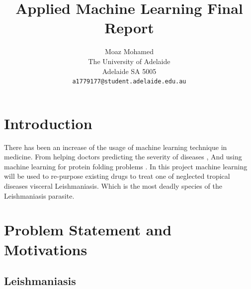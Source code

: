 \documentclass[10pt,twocolumn,letterpaper]{article}
\begin{document}
\title{Applied Machine Learning Final Report}

\author{Moaz Mohamed\\
The University of Adelaide\\
Adelaide SA 5005\\
{\tt\small a1779177@student.adelaide.edu.au}
}

\maketitle


\section{Introduction}

There has been an increase of the usage of machine learning technique in medicine. From helping doctors predicting the severity of diseases \cite{Yao2020}, And using machine learning for protein folding problems \cite{Noe2020}. In this project machine learning will be used to re-purpose existing drugs to treat one of neglected tropical diseases visceral Leishmaniasis. Which is the most deadly species of the Leishmaniasis parasite.



\section{Problem Statement and Motivations}
\subsection{Leishmaniasis}
\end{document}
